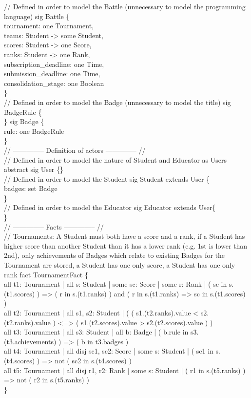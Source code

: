 \documentclass{Configuration_Files/Template}
\begin{document}
// Defined in order to model the Battle (unnecessary to model the programming language)
sig Battle \{\\
tournament: one Tournament,\\
teams: Student -> some Student,\\
scores: Student -> one Score,\\
ranks: Student -> one Rank,\\
subscription\_deadline: one Time,\\
submission\_deadline: one Time,\\
consolidation\_stage: one Boolean\\
\}\\

// Defined in order to model the Badge (unnecessary to model the title)
sig BadgeRule \{\\
\}
sig Badge \{\\
rule: one BadgeRule\\
\}\\

// -------------- Definition of actors -------------- //\\

// Defined in order to model the nature of Student and Educator as Users
abstract sig User \{\}\\

// Defined in order to model the Student
sig Student extends User \{\\
badges: set Badge\\
\}\\

// Defined in order to model the Educator
sig Educator extends User\{\\
\}\\

//  -------------- Facts -------------- //\\

// Tournaments: A Student must both have a score and a rank, if a Student has higher score than another Student than it has a lower rank (e.g. 1st is lower than 2nd), only achievements of Badges which relate to existing Badges for the Tournament are stored, a Student has one only score, a Student has one only rank
fact TournamentFact \{\\

    all t1: Tournament | all s: Student | some sc: Score | some r: Rank | ( sc in s.(t1.scores) ) => ( r in s.(t1.ranks) ) and ( r in s.(t1.ranks) => sc in s.(t1.scores) )\\
    all t2: Tournament | all s1, s2: Student | ( ( s1.(t2.ranks).value < s2.(t2.ranks).value ) <=> ( s1.(t2.scores).value > s2.(t2.scores).value ) )\\
    all t3: Tournament | all s3: Student | all b: Badge | ( b.rule in s3.(t3.achievements) ) => ( b in t3.badges )\\
    all t4: Tournament | all disj sc1, sc2: Score | some s: Student | ( sc1 in s.(t4.scores) ) => not ( sc2 in s.(t4.scores) )\\
    all t5: Tournament | all disj r1, r2: Rank | some s: Student | ( r1 in s.(t5.ranks) ) => not ( r2 in s.(t5.ranks) )\\
\}\\
\end{document}
